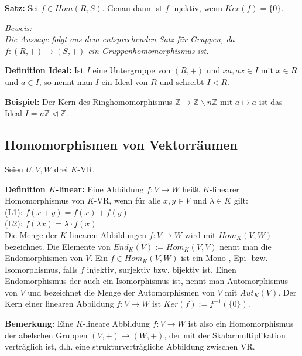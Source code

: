 \documentclass[11pt]{article}
\begin{document}
		\begin{framed}
			\textbf{Satz:} Sei $f\in Hom(R,S)$. Genau dann ist $f$ injektiv, wenn $Ker(f)=\{0\}$.
		\end{framed}
		\textit{Beweis: \\
		Die Aussage folgt aus dem entsprechenden Satz für Gruppen, da $f:(R,+)\to (S,+)$ ein Gruppenhomomorphismus ist.} \\
		
		\begin{mdframed}[backgroundcolor=blue!20]
			\textbf{Definition Ideal:} Ist $I$ eine Untergruppe von $(R,+)$ und $xa,ax\in I$ mit $x\in R$ und $a\in I$, so nennt 
			man $I$ ein Ideal von $R$ und schreibt $I\vartriangleleft R$.
		\end{mdframed}
		
		\textbf{Beispiel:} Der Kern des Ringhomomorphismus $\mathbb Z\to \mathbb Z\backslash n\mathbb Z$ mit $a\mapsto 
		\overline a$ ist das Ideal $I=n\mathbb Z\vartriangleleft \mathbb Z$.
		
	\subsection{Homomorphismen von Vektorräumen}
		Seien $U,V,W$ drei $K$-VR. \\
		
		\begin{mdframed}[backgroundcolor=blue!20]
			\textbf{Definition $K$-linear:} Eine Abbildung $f: V \to W$ heißt $K$-linearer Homomorphismus von $K$-VR, wenn für 
			alle $x,y\in V$ und $\lambda\in K$ gilt: \\
			(L1): $f(x+y)=f(x)+f(y)$ \\
			(L2): $f(\lambda x)=\lambda \cdot f(x)$ \\
			Die Menge der $K$-linearen Abbildungen $f: V\to W$ wird mit $Hom_K(V,W)$ bezeichnet. Die Elemente von $End_K(V)
			:= Hom_K(V,V)$ nennt man die Endomorphismen von $V$. Ein $f\in Hom_K(V,W)$ ist ein Mono-, Epi- bzw. Isomorphismus, 
			falls $f$ injektiv, surjektiv bzw. bijektiv ist. Einen Endomorphismus der auch ein Isomorphismus ist, nennt man 
			Automorphismus von $V$ und bezeichnet die Menge der Automorphismen von $V$ mit $Aut_K(V)$. Der Kern einer linearen 
			Abbildung $f: V\to W$ ist $Ker(f):= f^{-1}(\{0\})$.
		\end{mdframed}
		
		\textbf{Bemerkung:} Eine $K$-lineare Abbildung $f: V\to W$ ist also ein Homomorphismus der abelschen Gruppen $(V,+) 
		\to(W,+)$, der mit der Skalarmultiplikation verträglich ist, d.h. eine strukturverträgliche Abbildung zwischen VR. \\
		
\end{document}
